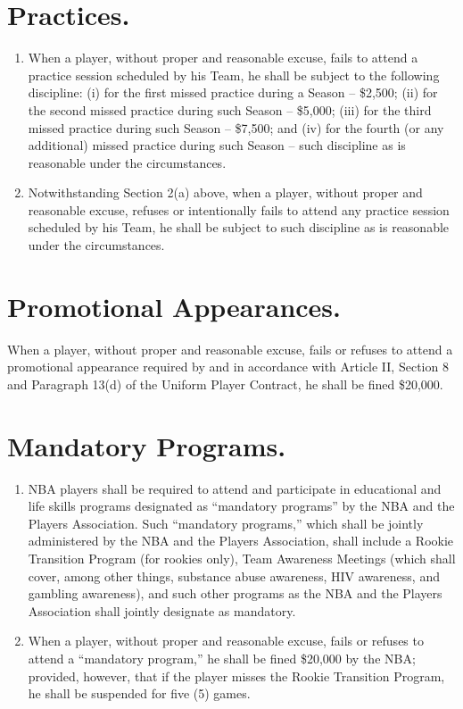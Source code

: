 \documentclass[
]{book}
\providecommand{\tightlist}{%
  \setlength{\itemsep}{0pt}\setlength{\parskip}{0pt}}
\begin{document}
\hypertarget{practices.}{%
\section{Practices.}\label{practices.}}

\begin{enumerate}
\def\labelenumi{(\alph{enumi})}
\tightlist
\item
  When a player, without proper and reasonable excuse, fails to attend a practice session scheduled by his Team, he shall be subject to the following discipline: (i) for the first missed practice during a Season -- \$2,500; (ii) for the second missed practice during such Season -- \$5,000; (iii) for the third missed practice during such Season -- \$7,500; and (iv) for the fourth (or any additional) missed practice during such Season -- such discipline as is reasonable under
  the circumstances.
\item
  Notwithstanding Section 2(a) above, when a player, without proper and reasonable excuse, refuses or intentionally fails to attend any practice session scheduled by his Team, he shall be subject to such discipline as is reasonable under the circumstances.
\end{enumerate}

\hypertarget{promotional-appearances.}{%
\section{Promotional Appearances.}\label{promotional-appearances.}}

When a player, without proper and reasonable excuse, fails or refuses to attend a promotional appearance required by and in accordance with Article II, Section 8 and Paragraph 13(d) of the Uniform Player Contract, he shall be fined \$20,000.

\hypertarget{mandatory-programs.}{%
\section{Mandatory Programs.}\label{mandatory-programs.}}

\begin{enumerate}
\def\labelenumi{(\alph{enumi})}
\tightlist
\item
  NBA players shall be required to attend and participate in educational and life skills programs designated as ``mandatory programs'' by the NBA and the Players Association. Such ``mandatory programs,'' which shall be jointly administered by the NBA and the Players Association, shall include a Rookie Transition Program (for rookies only), Team Awareness Meetings (which shall cover, among other things, substance abuse awareness, HIV awareness, and gambling awareness), and such other programs as the NBA and the Players Association shall jointly designate as mandatory.
\item
  When a player, without proper and reasonable excuse, fails or refuses to attend a ``mandatory program,'' he shall be fined \$20,000 by the NBA; provided, however, that if the player misses the Rookie Transition Program, he shall be suspended for five (5) games.
\end{enumerate}
\end{document}
